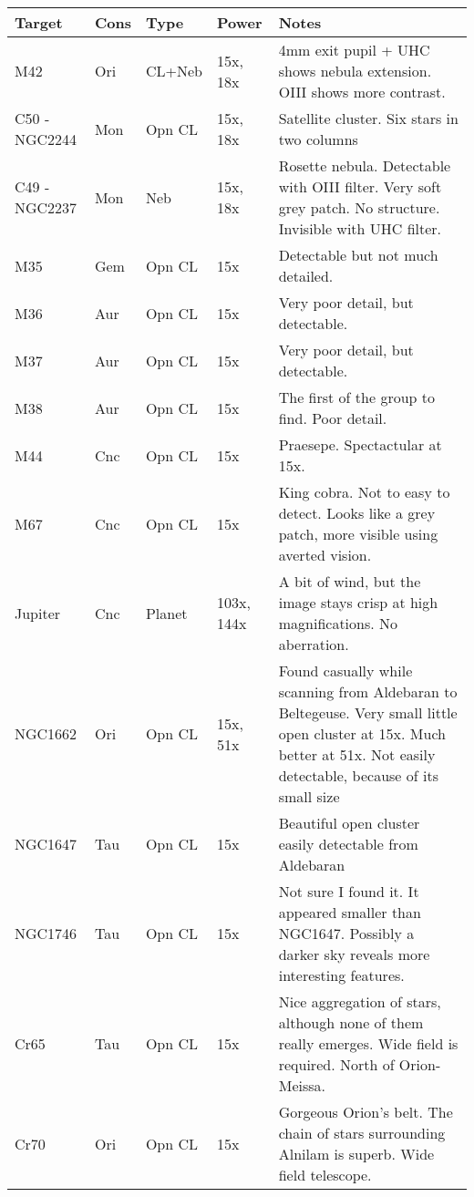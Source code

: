 \begin{longtable}{ p{0.7in}  p{0.3in}  p{0.6in}  p{0.9in}  p{5.8in} }
\hline 
{\bf Target} & {\bf Cons} & {\bf Type} & {\bf Power} & {\bf Notes} \\ 
\hline 
M42 & Ori & CL+Neb & 15x, 18x & 4mm exit pupil + UHC shows nebula extension. OIII shows more contrast. \\ 
C50 - NGC2244 & Mon & Opn CL & 15x, 18x & Satellite cluster. Six stars in two columns  \\ 
C49 - NGC2237 & Mon & Neb & 15x, 18x & Rosette nebula. Detectable with OIII filter. Very soft grey patch. No structure. Invisible with UHC filter. \\ 
M35 & Gem & Opn CL & 15x & Detectable but not much detailed. \\ 
M36 & Aur & Opn CL & 15x & Very poor detail, but detectable.  \\ 
M37 & Aur & Opn CL & 15x & Very poor detail, but detectable.  \\ 
M38 & Aur & Opn CL & 15x & The first of the group to find. Poor detail. \\ 
M44 & Cnc & Opn CL & 15x & Praesepe. Spectactular at 15x. \\ 
M67 & Cnc & Opn CL & 15x & King cobra. Not to easy to detect. Looks like a grey patch, more visible using averted vision. \\ 
Jupiter & Cnc & Planet & 103x, 144x & A bit of wind, but the image stays crisp at high magnifications. No aberration. \\ 
NGC1662 & Ori & Opn CL & 15x, 51x & Found casually while scanning from Aldebaran to Beltegeuse. Very small little open cluster at 15x. Much better at 51x. Not easily detectable, because of its small size \\ 
NGC1647 & Tau & Opn CL & 15x  & Beautiful open cluster easily detectable from Aldebaran \\ 
NGC1746 & Tau & Opn CL & 15x & Not sure I found it. It appeared smaller than NGC1647. Possibly a darker sky reveals more interesting features. \\ 
Cr65 & Tau & Opn CL & 15x & Nice aggregation of stars, although none of them really emerges. Wide field is required. North of Orion-Meissa. \\ 
Cr70 & Ori & Opn CL & 15x & Gorgeous Orion's belt. The chain of stars surrounding Alnilam is superb. Wide field telescope. \\ 
\hline 
\end{longtable} 
